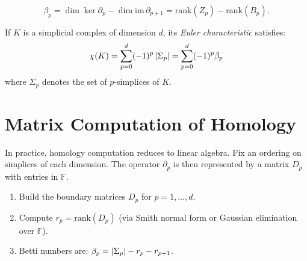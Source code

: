 \begin{keyformulas}[title=\textbf{Betti Number Formula}]
\[
  \beta_p = \dim \ker \partial_p - \dim \mathrm{im}\, \partial_{p+1}
  = \mathrm{rank}(Z_p) - \mathrm{rank}(B_p).
\]
\end{keyformulas}

\begin{theorem}
If $K$ is a simplicial complex of dimension $d$, its \emph{Euler
characteristic} satisfies:
\[
  \chi(K) = \sum_{p=0}^{d} (-1)^p \left| \Sigma_p \right|
  = \sum_{p=0}^{d} (-1)^p \beta_p
\]
where $\Sigma_p$ denotes the set of $p$-simplices of $K$.
\end{theorem}

\section{Matrix Computation of Homology}

In practice, homology computation reduces to linear algebra. Fix an
ordering on simplices of each dimension. The operator $\partial_p$ is
then represented by a matrix $D_p$ with entries in $\mathbb{F}$.

\begin{algorithme}[title=\textbf{Computing Betti Numbers}]
\begin{enumerate}
  \item Build the boundary matrices $D_p$ for $p = 1, \ldots, d$.
  \item Compute $r_p = \mathrm{rank}(D_p)$ (via Smith normal form or
        Gaussian elimination over $\mathbb{F}$).
  \item Betti numbers are: $\beta_p = \left| \Sigma_p \right| - r_p - r_{p+1}$.
\end{enumerate}
\end{algorithme}

